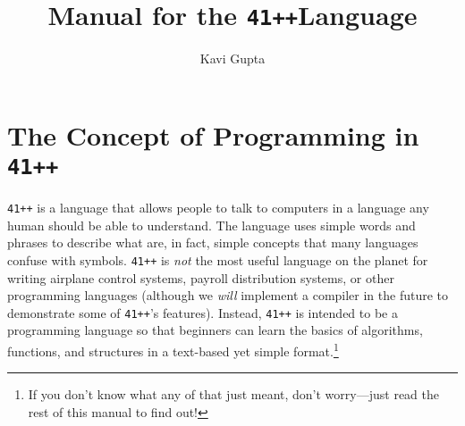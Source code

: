 \documentclass{article}
\newcommand{\code}[1]{\texttt{#1}}
\newcommand{\name}{\code{41++}}
\begin{document}
\title{Manual for the \name Language}
\author{Kavi Gupta}
\maketitle

\section{The Concept of Programming in \name}
\name{} is a language that allows people to talk to computers in a language any human should be able to understand. The language uses simple words and phrases to describe what are, in fact, simple concepts that many languages confuse with symbols. \name{} is \emph{not} the most useful language on the planet for writing airplane control systems, payroll distribution systems, or other programming languages (although we \emph{will} implement a compiler in the future to demonstrate some of \name{}'s features). Instead, \name{} is intended to be a programming language so that beginners can learn the basics of algorithms, functions, and structures in a text-based yet simple format.\footnote{If you don't know what any of that just meant, don't worry---just read the rest of this manual to find out!}
\end{document}
